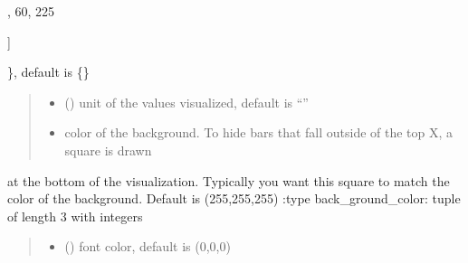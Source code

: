\documentclass[letterpaper,10pt,english]{sphinxmanual}
\begin{document}
\begin{fulllineitems}
\begin{quote}
\begin{description}
\end{description}\end{quote}
\begin{description}
\begin{description}
\sphinxlineitem{\{}\begin{description}
\sphinxlineitem{“United States”: {[}}
,
60,
225

\end{description}

\sphinxAtStartPar
{]}

\end{description}

\sphinxAtStartPar
\}, default is \{\}

\end{description}
\begin{quote}\begin{description}
\begin{itemize}
\item {} 
\sphinxAtStartPar
{} () \textendash{} unit of the values visualized, default is “”

\item {} 
\sphinxAtStartPar
{} \textendash{} color of the background. To hide bars that fall outside of the top X, a square is drawn

\end{itemize}

\end{description}\end{quote}

\sphinxAtStartPar
at the bottom of the visualization. Typically you want this square to match the color of the background. Default is (255,255,255)
:type back\_ground\_color: tuple of length 3 with integers
\begin{quote}\begin{description}
\begin{itemize}
\item {} 
\sphinxAtStartPar
{} () \textendash{} font color, default is (0,0,0)


\end{itemize}
\end{description}
\end{quote}
\end{fulllineitems}
\end{document}
